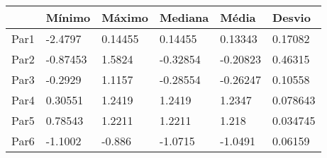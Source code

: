 \begin{tabular}{llllll}
& Mínimo & Máximo & Mediana & Média & Desvio \\ 
\hline 
Par1 & -2.4797 & 0.14455 & 0.14455 & 0.13343 & 0.17082 \\ 
Par2 & -0.87453 & 1.5824 & -0.32854 & -0.20823 & 0.46315 \\ 
Par3 & -0.2929 & 1.1157 & -0.28554 & -0.26247 & 0.10558 \\ 
Par4 & 0.30551 & 1.2419 & 1.2419 & 1.2347 & 0.078643 \\ 
Par5 & 0.78543 & 1.2211 & 1.2211 & 1.218 & 0.034745 \\ 
Par6 & -1.1002 & -0.886 & -1.0715 & -1.0491 & 0.06159 \\ 
\hline 
\end{tabular}